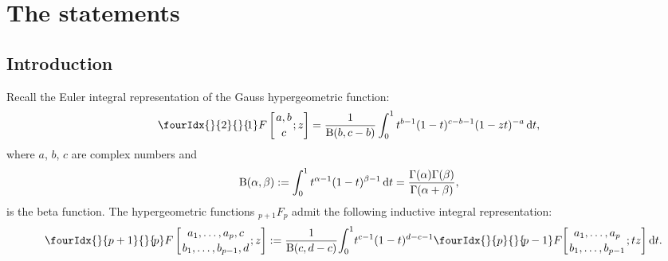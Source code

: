 \documentclass[pdftex]{sigma}
\numberwithin{equation}{section}
\newcommand{\hyp}[2]{\fourIdx{}{#1}{}{\!#2}F}
\def\B{\mathrm B}
\def\B{\mathrm{B}}
\begin{document}
\renewcommand{\thefootnote}{\arabic{footnote}}
\setcounter{footnote}{0}

\section{The statements}

\subsection{Introduction}
Recall the Euler integral representation of the Gauss hypergeometric function:
\begin{equation}
\hyp{2}{1}\left[\genfrac{}{}{0pt}{}{a,b}{c};z\right]
=\frac{1}{\B(b,c-b)}\int_0^1 t^{b-1} (1-t)^{c-b-1} (1-zt)^{-a}\,{\rm d}t,
\label{eq:F21}
\end{equation}
where $a$, $b$, $c$ are complex numbers and
\begin{equation}
 \B(\alpha,\beta):=\int_0^1 t^{\alpha-1}(1-t)^{\beta-1}\,{\rm d}t= \frac{\Gamma(\alpha)\Gamma(\beta)}{\Gamma(\alpha+\beta)},
 \label{eq:beta-real}
\end{equation}
is the beta function. The hypergeometric functions $_{p+1}F_p$ admit the following inductive integral representation:
\begin{gather}
\hyp{p+1}{p}\left[\genfrac{}{}{0pt}{}{a_1,\dots,a_p,c}
{b_1,\dots,b_{p-1},d};z\right] :=
\frac{1}{\B(c,d-c)}\!\int_0^1\! t^{c-1} (1-t)^{d-c-1}
\hyp{p}{p-1}\!\left[\genfrac{}{}{0pt}{}{a_1,\dots,a_p}
{b_1,\dots,b_{p-1}};tz\right] {\rm d}t.\!\!\!\!\!
\label{eq:inductive}
\end{gather}
\end{document}
